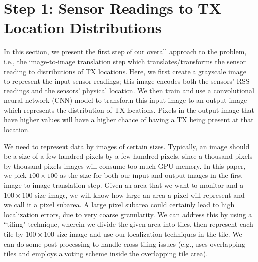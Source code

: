 \section{\our Step 1: Sensor Readings to TX Location Distributions}
\label{sec:translate}

In this section, we present the first step of our overall approach to the \mtl problem, i.e., 
the image-to-image translation step which translates/transforms the sensor reading to distributions
of TX locations. Here, we first create a grayscale image to represent the input sensor readings;
this image encodes both the sensors' RSS readings and the sensors' physical location. We then train and use
a convolutional neural network (CNN) model to transform this input image
to an output image which represents the distribution of TX locations. Pixels in the output image that have higher values will have a higher chance of having a TX being present at that location. 
 
We need to represent data by images of certain sizes.
Typically, an image should be a size of a few hundred pixels by a few hundred pixels, since a thousand pixels by thousand pixels images will consume too much GPU memory.
In this paper, we pick $100\times 100$ as the size for both our input and output images in the first image-to-image translation step.
Given an area that we want to monitor and a $100\times100$ size image, we will know how large an area a pixel will represent and we call it a pixel subarea.
A large pixel subarea could certainly lead to high localization errors, due
to very coarse granularity. We can address this by using a ``tiling"
technique, wherein we divide the given area into tiles, then represent each 
tile by $100\times100$ size image and use our localization techniques in the tile.
We can do some post-processing to handle cross-tiling issues (e.g., \cite{icccn20-deeptxfinder} uses overlapping tiles and employs a voting scheme inside the overlapping tile area).
 
